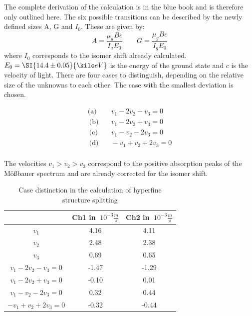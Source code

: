 The complete derivation of the calculation is in the blue book and is therefore only outlined here. The six possible transitions can be described by the newly defined sizes A, G and $I_0$. These are given by:
\begin{equation}
    A = \frac{\mu_aBc}{I_aE_0} \qquad
    G = \frac{\mu_gBc}{I_gE_0}
\label{eq:unk1}
\end{equation}
where $I_0$ corresponds to the isomer shift already calculated. $E_0 =\SI{14.4\pm0.05}{\kilo eV}$ is the energy of the ground state and $c$ is the velocity of light. There are four cases to distinguish, depending on the relative size of the unknowns to each other. The case with the smallest deviation is chosen.

\begin{align*}
\text{(a)}& \quad v_1-2v_2-v_3=0 \\\
\text{(b)}& \quad v_1-2v_2+v_3=0 \\\
\text{(c)}& \quad v_1-v_2-2v_3=0 \\\
\text{(d)}& \quad -v_1+v_2+2v_3=0 \\\
\end{align*}

The velocities $v_1 >v_2 >v_3$ correspond to the positive absorption peaks of the Mößbauer spectrum and are already corrected for the isomer shift.

\begin{table}
    \centering
    \caption{Case distinction in the calculation of hyperfine structure splitting}
    \begin{tabular}{c c c}
    \toprule
         &Ch1 in $\SI{}{10^{-3}\frac{m}{s}}$ &Ch2 in $\SI{}{10^{-3}\frac{m}{s}}$  \\
         \hline
         $v_1$&4.16 &4.11 \\
         $v_2$&2.48&2.38 \\
         $v_3$&0.69&0.65 \\
         \hline
         $v_1-2v_2-v_3=0$&-1.47&-1.29\\
         $v_1-2v_2+v_3=0$&-0.10&0.01\\
         $v_1-v_2-2v_3=0$&0.32&0.44\\
         $-v_1+v_2+2v_3=0$&-0.32&-0.44\\



    \bottomrule
    \end{tabular}
    \label{tab:fe1}
\end{table}

